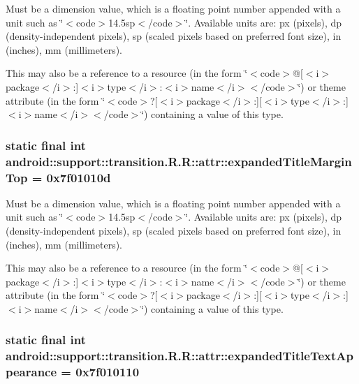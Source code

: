 Must be a dimension value, which is a floating point number appended with a unit such as \char`\"{}$<$code$>$14.5sp$<$/code$>$\char`\"{}. Available units are: px (pixels), dp (density-independent pixels), sp (scaled pixels based on preferred font size), in (inches), mm (millimeters). 

This may also be a reference to a resource (in the form \char`\"{}$<$code$>$@\mbox{[}$<$i$>$package$<$/i$>$:\mbox{]}$<$i$>$type$<$/i$>$:$<$i$>$name$<$/i$>$$<$/code$>$\char`\"{}) or theme attribute (in the form \char`\"{}$<$code$>$?\mbox{[}$<$i$>$package$<$/i$>$:\mbox{]}\mbox{[}$<$i$>$type$<$/i$>$:\mbox{]}$<$i$>$name$<$/i$>$$<$/code$>$\char`\"{}) containing a value of this type. \hypertarget{classandroid_1_1support_1_1transition_1_1_r_1_1attr_22fac8e0f488bac090c07d690a4f8a12}{
\subsubsection[{expandedTitleMarginTop}]{\setlength{\rightskip}{0pt plus 5cm}static final int android::support::transition.R.R::attr::expandedTitleMarginTop = 0x7f01010d}}
\label{classandroid_1_1support_1_1transition_1_1_r_1_1attr_22fac8e0f488bac090c07d690a4f8a12}


Must be a dimension value, which is a floating point number appended with a unit such as \char`\"{}$<$code$>$14.5sp$<$/code$>$\char`\"{}. Available units are: px (pixels), dp (density-independent pixels), sp (scaled pixels based on preferred font size), in (inches), mm (millimeters). 

This may also be a reference to a resource (in the form \char`\"{}$<$code$>$@\mbox{[}$<$i$>$package$<$/i$>$:\mbox{]}$<$i$>$type$<$/i$>$:$<$i$>$name$<$/i$>$$<$/code$>$\char`\"{}) or theme attribute (in the form \char`\"{}$<$code$>$?\mbox{[}$<$i$>$package$<$/i$>$:\mbox{]}\mbox{[}$<$i$>$type$<$/i$>$:\mbox{]}$<$i$>$name$<$/i$>$$<$/code$>$\char`\"{}) containing a value of this type. \hypertarget{classandroid_1_1support_1_1transition_1_1_r_1_1attr_ab677c89536a171bef2f456cf289e863}{
\subsubsection[{expandedTitleTextAppearance}]{\setlength{\rightskip}{0pt plus 5cm}static final int android::support::transition.R.R::attr::expandedTitleTextAppearance = 0x7f010110}}
\label{classandroid_1_1support_1_1transition_1_1_r_1_1attr_ab677c89536a171bef2f456cf289e863}


